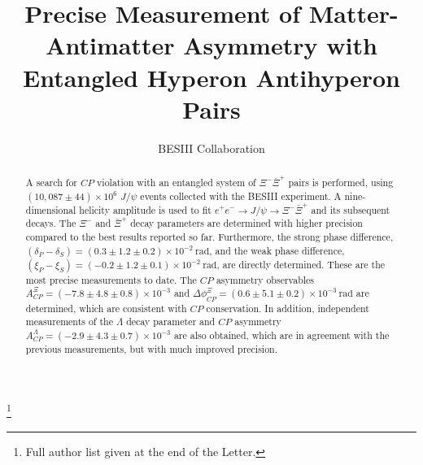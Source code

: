 \documentclass[aps,amsmath,amssymb,reprint]{revtex4-2}
\newcommand{\xim}{\Xi^{-}}
\newcommand{\xip}{\bar{\Xi}^{+}}
\newcommand{\XXb}{\Xi^{-}\bar{\Xi}^{+}}
\newcommand{\jpsi}{J/\psi}
\newcommand{\EE}{e^+e^-}
\begin{document}
\title{Precise Measurement of Matter-Antimatter Asymmetry with Entangled Hyperon Antihyperon Pairs}

\author{BESIII Collaboration}
\thanks{Full author list given at the end of the Letter.}


\begin{abstract}
A search for $CP$ violation with an entangled system of $\Xi^-\bar\Xi^+$ pairs is performed, using $(10,087\pm44)\times10^{6}$ $J/\psi$ events collected with the BESIII experiment. A nine-dimensional helicity amplitude is used to fit $\EE\to\jpsi\to\XXb$ and its subsequent decays. The $\xim$ and $\xip$ decay parameters are determined with higher precision compared to the best results reported so far. Furthermore, the strong phase difference, $(\delta_P-\delta_S)=(0.3\pm1.2\pm0.2)\times10^{-2}~\text{rad}$, and the weak phase difference, $(\xi_P-\xi_S)=(-0.2\pm1.2\pm0.1)\times10^{-2}~\text{rad}$, are directly determined. These are the most precise measurements to date. The $CP$ asymmetry observables $A_{CP}^{\Xi}=(-7.8\pm4.8\pm0.8)\times10^{-3}$ and $\Delta\phi_{CP}^{\Xi}=(0.6\pm5.1\pm0.2)\times10^{-3}~\text{rad}$ are determined, which are consistent with $CP$ conservation.
In addition, independent measurements of the $\Lambda$ decay parameter and $CP$ asymmetry $A^{\Lambda}_{CP}=(-2.9\pm4.3\pm0.7)\times10^{-3}$ are also obtained, which are in agreement with the previous measurements, but with much improved precision.

\end{abstract}



\maketitle
\end{document}
